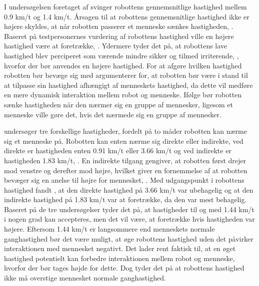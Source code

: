 I undersøgelsen foretaget af \textcite[s. 169]{PDF:HumanRobotEmodiedInteraction} svinger robottens gennemsnitlige hastighed mellem 0.9 km/t og 1.4 km/t. Årsagen til at robottens gennemsnitlige hastighed ikke er højere skyldes, at når robotten passerer et menneske sænkes hastigheden, \parencite[s. 169]{PDF:HumanRobotEmodiedInteraction}. Baseret på testpersonernes vurdering af robottens hastighed ville en højere hastighed være at foretrække, \parencite[s. 169]{PDF:HumanRobotEmodiedInteraction}. Ydermere tyder det på, at robottens lave hastighed blev perciperet som værende mindre sikker og tilmed irriterende, \parencite[s. 169]{PDF:HumanRobotEmodiedInteraction}, hvorfor der bør anvendes en højere hastighed. For at afgøre hvilken hastighed robotten bør bevæge sig med argumenterer \textcite[s. 167]{PDF:HumanRobotEmodiedInteraction} for, at robotten bør være i stand til at tilpasse sin hastighed afhængigt af menneskets hastighed, da dette vil medføre en mere dynamisk interaktion mellem robot og menneske. Ifølge \textcite[s. 1897]{PDF:NavigationForHRITasks} bør robotten sænke hastigheden når den nærmer sig en gruppe af mennesker, ligesom et menneske ville gøre det, hvis det nærmede sig en gruppe af mennesker.

\textcite[ss. 192-103]{PDF:PsychologicalEffects} undersøger tre forskellige hastigheder, fordelt på to måder robotten kan nærme sig et menneske på. Robotten kan enten nærme sig direkte eller indirekte, ved direkte er hastigheden enten 0.91 km/t eller 3.66 km/t og ved indirekte er hastigheden 1.83 km/t, \parencite[ss. 192-103]{PDF:PsychologicalEffects}. En indirekte tilgang gengiver, at robotten først drejer mod venstre og derefter mod højre, hvilket giver en fornemmelse af at robotten bevæger sig en anelse til højre for mennesket, \parencite[s. 193]{PDF:PsychologicalEffects}. Med udgangspunkt i robottens hastighed fandt \textcite[s. 196]{PDF:PsychologicalEffects}, at den direkte hastighed på 3.66 km/t var ubehagelig og at den indirekte hastighed på 1.83 km/t var at foretrække, da den var mest behagelig. \blankline  
%
Baseret på de tre undersøgelser tyder det på, at hastigheder til og med 1.44 km/t i nogen grad kan accepteres, men det vil være, at foretrække hvis hastigheden var højere. Eftersom 1.44 km/t er langsommere end menneskets normale ganghastighed bør det være muligt, at øge robottens hastighed uden det påvirker interaktionen med mennesket negativt. Det lader rent faktisk til, at en øget hastighed potentielt kan forbedre interaktionen mellem robot og menneske, hvorfor der bør tages højde for dette. Dog tyder det på at robottens hastighed ikke må overstige mennesket normale ganghastighed.       
%

